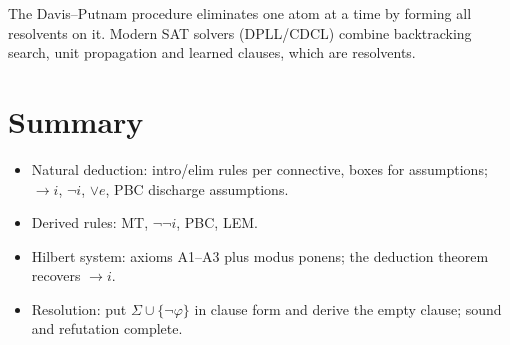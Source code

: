 \begin{aside}
The Davis--Putnam procedure eliminates one atom at a time by forming all resolvents on it.
Modern SAT solvers (DPLL/CDCL) combine backtracking search, unit propagation and learned
clauses, which are resolvents.
\end{aside}

\section*{Summary}
\begin{itemize}
  \item Natural deduction: intro/elim rules per connective, boxes for assumptions;
        $\to i$, $\neg i$, $\lor e$, PBC discharge assumptions.
  \item Derived rules: MT, $\neg\neg i$, PBC, LEM.
  \item Hilbert system: axioms A1--A3 plus modus ponens; the deduction theorem recovers
        $\to i$.
  \item Resolution: put $\Sigma\cup\{\neg\varphi\}$ in clause form and derive the empty
        clause; sound and refutation complete.
\end{itemize}
